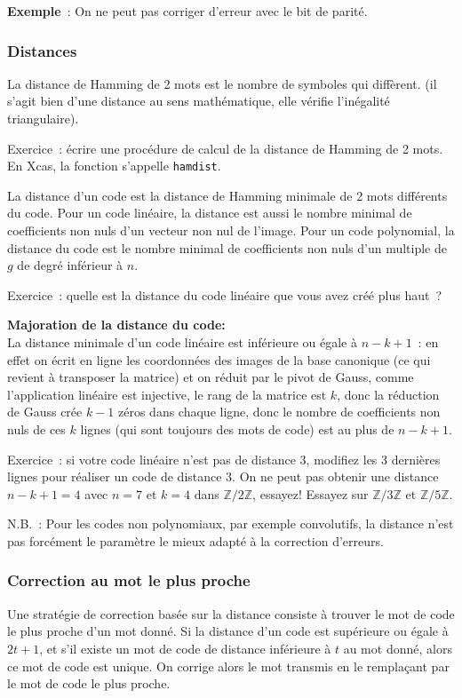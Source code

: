 \documentclass[a4paper,11pt]{article}
\newcommand{\Z}{{\mathbb{Z}}}
\begin{document}
\begin{giacjshere}
{\bf Exemple}~: On ne peut pas corriger d'erreur avec le bit de parité.

\subsubsection{Distances} 
La distance de Hamming de 2 mots est le nombre de symboles qui diffèrent.
(il s'agit bien d'une distance au sens mathématique, 
elle v\'erifie l'in\'egalit\'e triangulaire). 

Exercice~: écrire une procédure de calcul de la distance de Hamming
de 2 mots. En Xcas, la fonction s'appelle {\tt hamdist}.

La distance d'un code est la distance de Hamming minimale
de 2 mots diff\'erents du code.
Pour un code lin\'eaire, la distance est aussi le nombre minimal
de coefficients non nuls d'un vecteur non nul de l'image.
Pour un code polynomial, la distance du code
est le nombre minimal de coefficients non nuls d'un multiple
de $g$ de degr\'e inf\'erieur \`a $n$.

Exercice~: quelle est la distance du code linéaire que
vous avez créé plus haut~?

{\bf Majoration de la distance du code:}\\
La distance minimale d'un code lin\'eaire est inf\'erieure ou 
\'egale \`a $n-k+1$~: en effet on écrit en ligne les coordonnées
des images de la base canonique (ce qui revient \`a transposer la
matrice) et on réduit par le pivot de Gauss,
comme l'application linéaire est injective, le rang de la matrice
est $k$, donc la réduction de Gauss crée $k-1$
zéros dans chaque ligne, donc le nombre de coefficients non nuls
de ces $k$ lignes (qui sont toujours des mots de code) est 
au plus de $n-k+1$.

Exercice~: si votre code linéaire n'est pas de distance 3, modifiez
les 3 dernières lignes pour réaliser un code de distance 3. On
ne peut pas obtenir une distance $n-k+1=4$ avec $n=7$ et $k=4$ 
dans $\Z/2\Z$, essayez! Essayez sur $\Z/3\Z$ et $\Z/5\Z$.

N.B.~: Pour les codes non
polynomiaux, par exemple convolutifs, la distance n'est pas
forc\'ement le
param\`etre le mieux adapt\'e \`a la correction d'erreurs.

\subsubsection{Correction au mot le plus proche}
Une strat\'egie de correction bas\'ee sur la distance consiste \`a
trouver le mot de code le plus proche d'un mot donn\'e.
Si la distance d'un code est sup\'erieure ou \'egale
\`a $2t+1$, et s'il existe un mot de code de distance inf\'erieure
\`a $t$ au mot donn\'e, alors ce mot de code est unique.
On corrige alors le mot transmis en le remplaçant par le mot de code
le plus proche.


\end{giacjshere}
\end{document}
